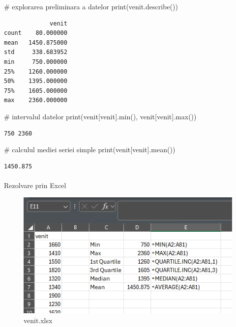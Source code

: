 \documentclass[
  11pt,
  b5paper,
  nottoc]{book}
\makeatletter
\let\oldparagraph\paragraph
\renewcommand{\paragraph}{
    \@ifstar
      \xxxParagraphStar
      \xxxParagraphNoStar
  }
\newcommand{\xxxParagraphStar}[1]{\oldparagraph*{#1}\mbox{}}
\newcommand{\xxxParagraphNoStar}[1]{\oldparagraph{#1}\mbox{}}
\newenvironment{Shaded}{\begin{snugshade}}{\end{snugshade}}
\newcommand{\BuiltInTok}[1]{\textcolor[rgb]{0.00,0.23,0.31}{#1}}
\newcommand{\CommentTok}[1]{\textcolor[rgb]{0.37,0.37,0.37}{#1}}
\newcommand{\NormalTok}[1]{\textcolor[rgb]{0.00,0.23,0.31}{#1}}
\newcommand{\StringTok}[1]{\textcolor[rgb]{0.13,0.47,0.30}{#1}}
\makeatother
\begin{document}
\begin{Shaded}
\begin{Highlighting}[]
\CommentTok{\# explorarea preliminara a datelor}
\BuiltInTok{print}\NormalTok{(venit.describe())}
\end{Highlighting}
\end{Shaded}

\begin{verbatim}
             venit
count    80.000000
mean   1450.875000
std     338.683952
min     750.000000
25%    1260.000000
50%    1395.000000
75%    1605.000000
max    2360.000000
\end{verbatim}

\begin{Shaded}
\begin{Highlighting}[]
\CommentTok{\# intervalul datelor}
\BuiltInTok{print}\NormalTok{(venit[}\StringTok{\textquotesingle{}venit\textquotesingle{}}\NormalTok{].}\BuiltInTok{min}\NormalTok{(), venit[}\StringTok{\textquotesingle{}venit\textquotesingle{}}\NormalTok{].}\BuiltInTok{max}\NormalTok{())}
\end{Highlighting}
\end{Shaded}

\begin{verbatim}
750 2360
\end{verbatim}

\begin{Shaded}
\begin{Highlighting}[]
\CommentTok{\# calculul mediei seriei simple}
\BuiltInTok{print}\NormalTok{(venit[}\StringTok{\textquotesingle{}venit\textquotesingle{}}\NormalTok{].mean())}
\end{Highlighting}
\end{Shaded}

\begin{verbatim}
1450.875
\end{verbatim}

\paragraph{Rezolvare prin Excel}\label{rezolvare-prin-excel}

\begin{figure}[H]

{\centering \includegraphics{date/medie_simpla.PNG}

}

\caption{venit.xlsx}

\end{figure}%
\end{document}
